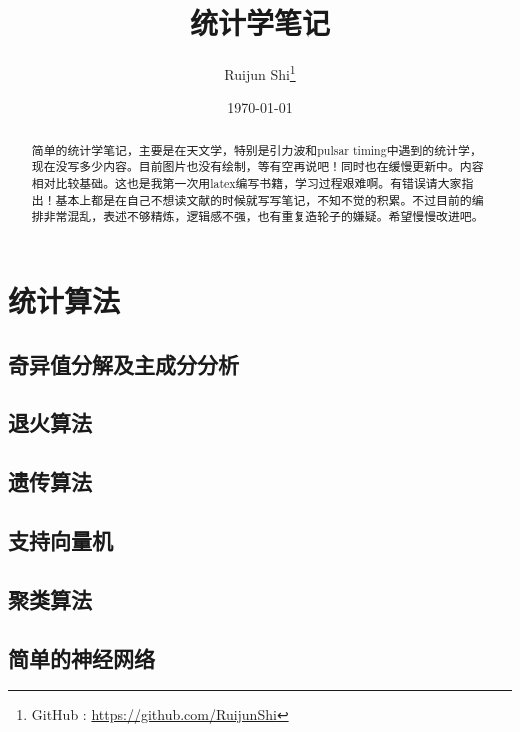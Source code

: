 \documentclass[fontset=windows]{report}
\title{\heiti\zihao{1} 统计学笔记}
\author{\songti\zihao{3} Ruijun Shi\thanks{GitHub : \href{https://github.com/RuijunShi}{https://github.com/RuijunShi}}}
\date{\songti\zihao{3} \today}
\begin{document}
	\maketitle
	\thispagestyle{empty}
\begin{abstract}
	简单的统计学笔记，主要是在天文学，特别是引力波和pulsar timing中遇到的统计学，现在没写多少内容。目前图片也没有绘制，等有空再说吧！同时也在缓慢更新中。内容相对比较基础。这也是我第一次用latex编写书籍，学习过程艰难啊。有错误请大家指出！基本上都是在自己不想读文献的时候就写写笔记，不知不觉的积累。不过目前的编排非常混乱，表述不够精炼，逻辑感不强，也有重复造轮子的嫌疑。希望慢慢改进吧。
\end{abstract}

\tableofcontents %
\newtheorem{definition}{\textbf{\setlength{\parindent}{2em} \heiti 定义}}[chapter]
\newtheorem{prop}{\textbf{\setlength{\parindent}{2em} \heiti 性质}}[chapter]
\newtheorem{theorem}{\textbf{\setlength{\parindent}{2em} \heiti 定理}}[chapter]

%





\chapter{统计算法}
	\section{奇异值分解及主成分分析}
	\section{退火算法}
	\section{遗传算法}
	\section{支持向量机}
	\section{聚类算法}
	\section{简单的神经网络}

\end{document}
